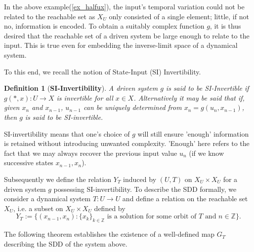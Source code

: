 \documentclass[a4paper,12pt,twoside]{report}
\newtheorem{Definition}{Definition}[]
\begin{document}

In the above example(\ref{ex_halfux}), the input's temporal variation could not be related to the reachable set as $X_U$ only consisted of a single element; little, if not no, information is encoded.
To obtain a suitably complex function $g$, it is thus desired that the reachable set of a driven system  be large enough to relate to the input. 
This is true even for embedding  the inverse-limit space of a dynamical system. 


 To this end, we recall the notion of State-Input (SI) Invertibility.  

\begin{Definition}
  [\bf SI-Invertibility]\label{Dfn_SIinv}\rm
  A driven system $g$ is said to be SI-Invertible if $g(*,x): U \to X$ is invertible for all $x\in X$. Alternatively it may be said that if, given $x_n$ and $x_{n-1}$, $u_{n-1}$ can be uniquely determined from $x_n=g(u_n,x_{n-1})$, then $g$ is said to be SI-invertible.
\end{Definition}
 
SI-invertibility means that one's choice of $g$ will still ensure 'enough' information is retained without introducing unwanted complexity. 
'Enough' here refers to the fact that we may always recover the previous input value $u_n$ (if we know successive states $x_{n-1}, x_n$).

Subsequently we define the relation $Y_T$ induced by $(U,T)$ on $X_U\times{X_U}$ for a driven system $g$ possessing SI-invertibility.  
To describe the  SDD formally, we consider a dynamical system $T: U \to U$ and define a relation on the reachable set $X_U$, i.e. a subset on $X_U \times X_U$  defined by 
$$Y_T:=\{(x_{n-1},x_n): \{x_k\}_{k\in \mathbb{Z}} \mbox{ is a solution for some orbit of } T \mbox{ and } n \in \mathbb{Z}\}.$$ 

The following theorem establishes the existence of a well-defined map $G_T$ describing the SDD of the system above. 
\end{document}
